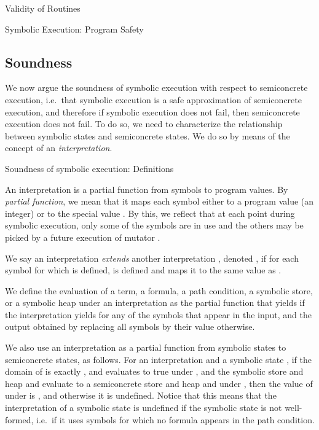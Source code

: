 \documentclass{CSML}
\theoremstyle{definition}\newtheorem{notation}[thm]{Notation}
\theoremstyle{plain}\newtheorem{satz}[thm]{Satz}
\begin{document}
\begin{defi}{Validity of Routines}



\end{defi}

\begin{defi}{Symbolic Execution: Program Safety}



\end{defi}

\subsection{Soundness}
We now argue the soundness of symbolic execution with respect to 
semiconcrete execution, i.e.~that symbolic execution is a safe 
approximation of semiconcrete execution, and therefore if symbolic 
execution does not fail, then semiconcrete execution does not fail. To do 
so, we need to characterize the relationship between symbolic states and 
semiconcrete states. We do so by means of the concept of an 
\emph{interpretation}. 

\begin{defi}{Soundness of symbolic execution: Definitions}



\end{defi}

\noindent An interpretation is a partial function from symbols to program values. By 
\emph{partial function}, we mean that it maps each symbol either to a 
program value (an integer) or to the special value . By 
this, we reflect that at each point during symbolic execution, only some 
of the symbols are in use and the others may be picked by a future 
execution of mutator . 

We say an interpretation  \emph{extends} another interpretation , 
denoted , if for each symbol for which  is defined, 
 is defined and  maps it to the same value as . 

We define the evaluation  of a term, a 
formula, a path condition, a symbolic store, or a symbolic heap under an 
interpretation  as the partial function that yields  if 
the interpretation yields  for any of the symbols that 
appear in the input, and the output obtained by replacing all symbols by 
their value otherwise. 

We also use an interpretation as a partial function from symbolic states 
to semiconcrete states, as follows. For an interpretation  and a 
symbolic state , if the domain of  is exactly 
, and  evaluates to true under , and the 
symbolic store and heap  and  evaluate to a semiconcrete store 
and heap  and  under , then the value of  under 
 is , and otherwise it is undefined. Notice that this means 
that the interpretation of a symbolic state is undefined if the symbolic 
state is not well-formed, i.e.~if it uses symbols  for which no 
formula  appears in the path condition. 
\end{document}
